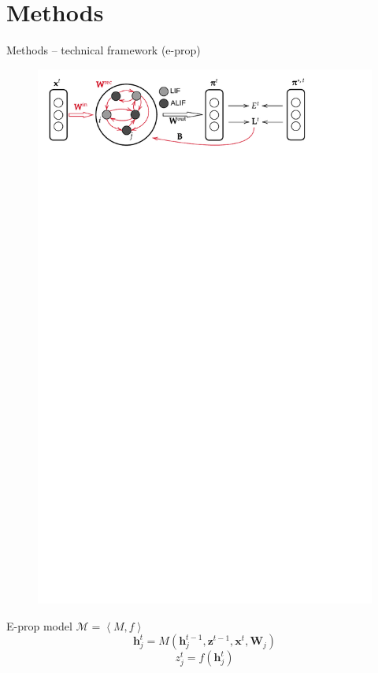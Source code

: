 \documentclass[t]{beamer}
\begin{document}
\section{Methods}
\begin{frame}{Methods -- technical framework (e-prop)}

  \begin{figure}[!ht]
    \centering
    \includegraphics[trim=0 25cm 0 0, clip, width=\linewidth]{Singlelayer}
  \end{figure}
  E-prop model $\mathcal{M} = \left<M, f\right>$
  \begin{equation}\label{eq:model}
    \mathbf{h}^t_j = M\left(\mathbf{h}_j^{t-1}, \mathbf{z}^{t-1}, \mathbf{x}^t, \mathbf{W}_j\right)
  \end{equation}
  \begin{equation}
  z^t_j = f\left(\mathbf{h}_j^t\right)
  \end{equation}
\end{frame}
\end{document}

